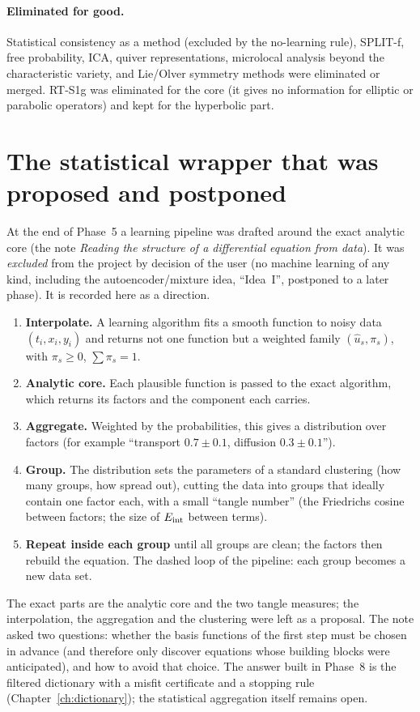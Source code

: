 \paragraph{Eliminated for good.} Statistical consistency as a method (excluded by the no-learning rule), SPLIT-f, free probability, ICA, quiver representations, microlocal analysis beyond the characteristic variety, and Lie/Olver symmetry methods were eliminated or merged. RT-S1g was eliminated for the core (it gives no information for elliptic or parabolic operators) and kept for the hyperbolic part.

\section{The statistical wrapper that was proposed and postponed}

At the end of Phase~5 a learning pipeline was drafted around the exact analytic core (the note \emph{Reading the structure of a differential equation from data}). It was \emph{excluded} from the project by decision of the user (no machine learning of any kind, including the autoencoder/mixture idea, ``Idea~I'', postponed to a later phase). It is recorded here as a direction.

\begin{enumerate}
\item \textbf{Interpolate.} A learning algorithm fits a smooth function to noisy data $(t_i,x_i,y_i)$ and returns not one function but a weighted family $(\hat u_s,\pi_s)$, with $\pi_s\ge0$, $\sum\pi_s=1$.
\item \textbf{Analytic core.} Each plausible function is passed to the exact algorithm, which returns its factors and the component each carries.
\item \textbf{Aggregate.} Weighted by the probabilities, this gives a distribution over factors (for example ``transport $0.7\pm0.1$, diffusion $0.3\pm0.1$'').
\item \textbf{Group.} The distribution sets the parameters of a standard clustering (how many groups, how spread out), cutting the data into groups that ideally contain one factor each, with a small ``tangle number'' (the Friedrichs cosine between factors; the size of $E_{\rm int}$ between terms).
\item \textbf{Repeat inside each group} until all groups are clean; the factors then rebuild the equation. The dashed loop of the pipeline: each group becomes a new data set.
\end{enumerate}
The exact parts are the analytic core and the two tangle measures; the interpolation, the aggregation and the clustering were left as a proposal. The note asked two questions: whether the basis functions of the first step must be chosen in advance (and therefore only discover equations whose building blocks were anticipated), and how to avoid that choice. The answer built in Phase~8 is the filtered dictionary with a misfit certificate and a stopping rule (Chapter~\ref{ch:dictionary}); the statistical aggregation itself remains open.

